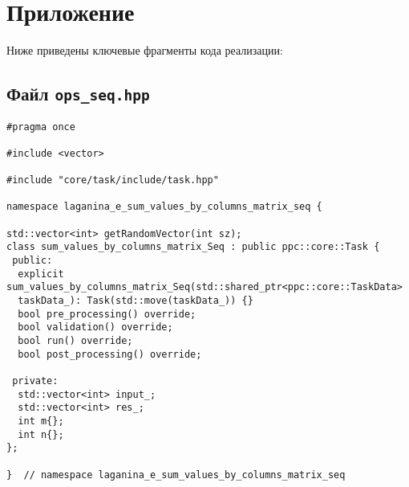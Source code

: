 \documentclass[12pt]{article}
\begin{document}
\section*{Приложение}
Ниже приведены ключевые фрагменты кода реализации:

\subsection*{Файл \texttt{ops\_seq.hpp}}
\begin{verbatim}
#pragma once

#include <vector>

#include "core/task/include/task.hpp"

namespace laganina_e_sum_values_by_columns_matrix_seq {

std::vector<int> getRandomVector(int sz);
class sum_values_by_columns_matrix_Seq : public ppc::core::Task {
 public:
  explicit sum_values_by_columns_matrix_Seq(std::shared_ptr<ppc::core::TaskData> 
  taskData_): Task(std::move(taskData_)) {}
  bool pre_processing() override;
  bool validation() override;
  bool run() override;
  bool post_processing() override;

 private:
  std::vector<int> input_;
  std::vector<int> res_;
  int m{};
  int n{};
};

}  // namespace laganina_e_sum_values_by_columns_matrix_seq
\end{verbatim}
\newpage

\end{document}
